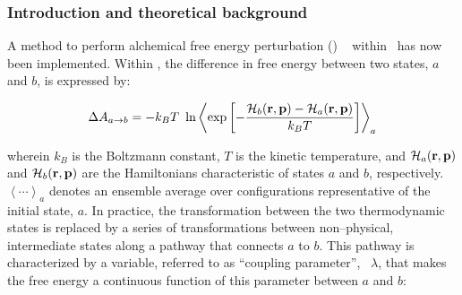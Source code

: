 





\subsubsection{Introduction and theoretical background}


A method to perform alchemical free energy perturbation (\FEP)
~\cite{zwan_54_1,Beveridge.89,Gunsteren.89,Straatsma.92,Kollman.93,Gilson.97,
Mark.98,chip_01_1} within \NAMD\ has now been implemented. 
Within \FEP, the difference in free energy between two states,
$a$ and $b$, is expressed by:

\begin{equation}
\Delta A_{a \rightarrow b} = -k_B T \ \ln
\left< \exp\left[-\frac{{\cal H}_b({\bf r}, {\bf p}) - 
                         {\cal H}_a({\bf r}, {\bf p})}
                        {k_B T}\right]
\right>_a
\end{equation}

wherein $k_B$ is the Boltzmann constant, $T$ is the kinetic temperature,
and ${\cal H}_a({\bf r}, {\bf p})$ and ${\cal H}_b({\bf r}, {\bf p})$
are the Hamiltonians characteristic of states $a$ and $b$, respectively.
$\left< \cdots \right>_a$ denotes an ensemble average over configurations
representative of the initial state, $a$.
In practice, the transformation between the two thermodynamic states
is replaced by a series of transformations between non--physical,
intermediate states along a pathway that connects $a$ to $b$.
This pathway is characterized by a variable, referred to as
``coupling parameter'',~\cite{Beveridge.89,Mark.98,king_93_1} 
$\lambda$, that makes the free energy
a continuous function of this parameter between $a$ and $b$:

